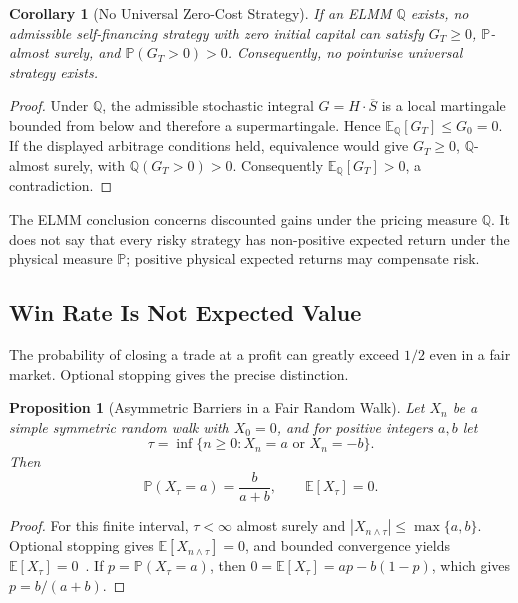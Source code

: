 \documentclass[aps,pra,reprint,superscriptaddress,amsmath,amssymb,floatfix]{revtex4-2}
\theoremstyle{plain}
\newtheorem{corollary}[theorem]{Corollary}
\newtheorem{proposition}[theorem]{Proposition}
\theoremstyle{definition}
\theoremstyle{remark}
\begin{document}
\begin{corollary}[No Universal Zero-Cost Strategy]
  \label{cor:noarb}
  If an ELMM \(\mathbb{Q}\) exists, no admissible self-financing strategy with
  zero initial capital can satisfy
  \(G_T\geq0\), \(\mathbb{P}\)-almost surely, and
  \(\mathbb{P}(G_T>0)>0\). Consequently, no pointwise universal strategy
  exists.
\end{corollary}

\begin{proof}
Under \(\mathbb{Q}\), the admissible stochastic integral
\(G=H\mathbin{\cdot}\overline S\) is a local martingale bounded from below and
therefore a supermartingale. Hence
\(\mathbb{E}_{\mathbb{Q}}[G_T]\leq G_0=0\). If the displayed arbitrage
conditions held, equivalence would give \(G_T\geq0\),
\(\mathbb{Q}\)-almost surely, with
\(\mathbb{Q}(G_T>0)>0\). Consequently
\(\mathbb{E}_{\mathbb{Q}}[G_T]>0\), a contradiction.
\end{proof}

The ELMM conclusion concerns discounted gains under the pricing measure
\(\mathbb{Q}\). It does not say that every risky strategy has non-positive
expected return under the physical measure \(\mathbb{P}\); positive physical
expected returns may compensate risk.

\subsection{Win Rate Is Not Expected Value}

The probability of closing a trade at a profit can greatly exceed \(1/2\)
even in a fair market. Optional stopping gives the precise distinction.

\begin{proposition}[Asymmetric Barriers in a Fair Random Walk]
  \label{prop:optional}
  Let \(X_n\) be a simple symmetric random walk with \(X_0=0\), and for positive
  integers \(a,b\) let
  \[
    \tau=\inf\{n\geq0:X_n=a\text{ or }X_n=-b\}.
  \]
  Then
  \begin{equation}
    \mathbb{P}(X_\tau=a)=\frac{b}{a+b},
    \qquad
    \mathbb{E}[X_\tau]=0.
    \label{eq:gambler}
  \end{equation}
\end{proposition}

\begin{proof}
For this finite interval, \(\tau<\infty\) almost surely and
\(|X_{n\wedge\tau}|\leq\max\{a,b\}\). Optional stopping gives
\(\mathbb E[X_{n\wedge\tau}]=0\), and bounded convergence yields
\(\mathbb E[X_\tau]=0\)~\cite{Doob1953}. If
\(p=\mathbb{P}(X_\tau=a)\), then
\(0=\mathbb{E}[X_\tau]=ap-b(1-p)\), which gives
\(p=b/(a+b)\).
\end{proof}
\end{document}
